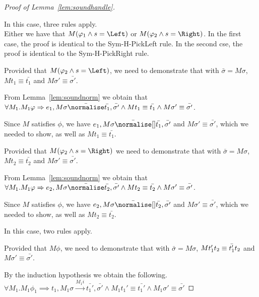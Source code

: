 \begin{proof}[Proof of Lemma~\ref{lem:soundhandle}]
{  }

  {
  In this case, three rules apply.\\
    {
    Either we have that $M(\phi_1\wedge s=\Left)$ or $M(\phi_2\wedge s=\Right)$.
    In the first case, the proof is identical to the Sym-H-PickLeft rule.
    In the second cse, the proof is identical to the Sym-H-PickRight rule.
    }

    {Provided that $M(\phi_2\wedge s=\Left)$, we need to demonstrate that  with $\bar{\sigma}=M\sigma$,
    $M t_1\equiv \bar{t_1}$ and $M\sigma'\equiv \bar{\sigma'}$.

    From Lemma~\ref{lem:soundnorm} we obtain that $\forall M_1. M_1 \phi \implies e_1,M\sigma\bar{\normalise}\bar{t_1},\bar{\sigma'}\land M t_1\equiv\bar{t_1}\land M \sigma'\equiv\bar{\sigma'}$.

    Since $M$ satisfies $\phi$, we have $e_1,M\sigma \bar{\normalise}[] \bar{t_1},\bar{\sigma'}$ and $M\sigma'\equiv\bar{\sigma'}$,
    which we needed to show, as well as $M t_1 \equiv \bar{t_1}$.

    }
    {Provided that $M(\phi_2\wedge s=\Right)$ we need to demonstrate that  with $\bar{\sigma}=M\sigma$,
    $M t_2\equiv \bar{t_2}$ and $M\sigma'\equiv \bar{\sigma'}$.

    From Lemma~\ref{lem:soundnorm} we obtain that $\forall M_1. M_1 \phi \implies e_2,M\sigma\bar{\normalise}\bar{t_2},\bar{\sigma'}\land M t_2\equiv\bar{t_2}\land M \sigma'\equiv\bar{\sigma'}$.

    Since $M$ satisfies $\phi$, we have $e_2,M\sigma \bar{\normalise}[] \bar{t_2},\bar{\sigma'}$ and $M\sigma'\equiv\bar{\sigma'}$,
    which we needed to show, as well as $M t_2 \equiv \bar{t_2}$.
    }
  }

  {
  In this case, two rules apply.\\
    {Provided that $M\phi$, we need to demonstrate that  with $\bar{\sigma}=M\sigma$,
    $M t_1'\relax t_2\equiv \bar{t_1'}\relax t_2$ and $M\sigma'\equiv \bar{\sigma'}$.

    By the induction hypothesis we obtain the following.\\
    $\forall M_1 . M_1 \phi_1 \implies t_1,M_1\sigma \xrightarrow[]{M_1 i} \bar{t_1'},\bar{\sigma'}\land M_1 t_1'\equiv\bar{t_1'}\land M_1\sigma' \equiv \bar{\sigma'}$

}}
\end{proof}
